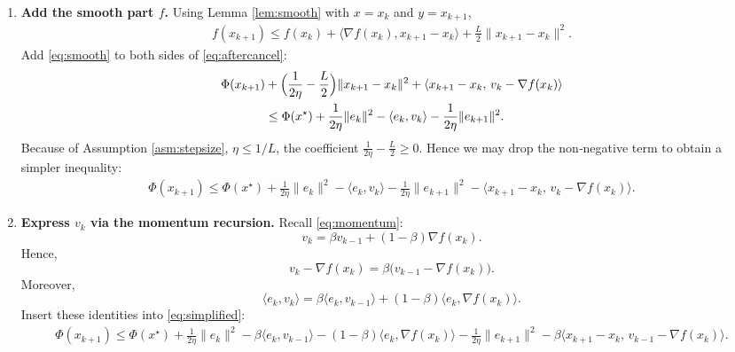 \documentclass{article}
\newcommand{\grad}{\nabla}
\begin{document}
\begin{enumerate}
\item[Step 4.] \textbf{Add the smooth part $f$.}  
Using Lemma \ref{lem:smooth} with $x=x_{k}$ and $y=x_{k+1}$,
\begin{align}
f(x_{k+1})\le f(x_{k})+\langle\grad f(x_{k}),x_{k+1}-x_{k}\rangle+\frac{L}{2}\|x_{k+1}-x_{k}\|^{2}. \label{eq:smooth}
\end{align}
Add \eqref{eq:smooth} to both sides of \eqref{eq:aftercancel}:
\begin{align}
\Phi(x_{k+1}) &+ \Bigl(\frac{1}{2\eta}-\frac{L}{2}\Bigr)\|x_{k+1}-x_{k}\|^{2}
+ \langle x_{k+1}-x_{k},\,v_{k}-\grad f(x_{k})\rangle \nonumber\\
&\le \Phi(x^{\star})+\frac{1}{2\eta}\|e_{k}\|^{2}
-\langle e_{k},v_{k}\rangle-\frac{1}{2\eta}\|e_{k+1}\|^{2}. \label{eq:combined}
\end{align}
Because of Assumption \ref{asm:stepsize}, $\eta\le 1/L$, the coefficient $\frac{1}{2\eta}-\frac{L}{2}\ge0$. Hence we may drop the non‑negative term to obtain a simpler inequality:
\begin{align}
\Phi(x_{k+1})\le \Phi(x^{\star})+\frac{1}{2\eta}\|e_{k}\|^{2}
-\langle e_{k},v_{k}\rangle-\frac{1}{2\eta}\|e_{k+1}\|^{2}
-\langle x_{k+1}-x_{k},\,v_{k}-\grad f(x_{k})\rangle. \label{eq:simplified}
\end{align}

\item[Step 5.] \textbf{Express $v_{k}$ via the momentum recursion.}  
Recall \eqref{eq:momentum}:
\[
v_{k}= \beta v_{k-1}+(1-\beta)\grad f(x_{k}).
\]
Hence,
\[
v_{k}-\grad f(x_{k})= \beta\bigl(v_{k-1}-\grad f(x_{k})\bigr).
\]
Moreover,
\[
\langle e_{k},v_{k}\rangle
= \beta\langle e_{k},v_{k-1}\rangle+(1-\beta)\langle e_{k},\grad f(x_{k})\rangle.
\]
Insert these identities into \eqref{eq:simplified}:
\begin{align}
\Phi(x_{k+1})\le \Phi(x^{\star})+\frac{1}{2\eta}\|e_{k}\|^{2}
-\beta\langle e_{k},v_{k-1}\rangle-(1-\beta)\langle e_{k},\grad f(x_{k})\rangle
-\frac{1}{2\eta}\|e_{k+1}\|^{2}
-\beta\langle x_{k+1}-x_{k},\,v_{k-1}-\grad f(x_{k})\rangle. \label{eq:aftermom}
\end{align}


\end{enumerate}
\end{document}
